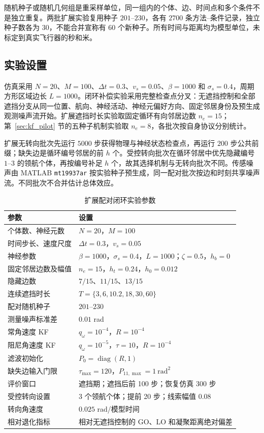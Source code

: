 \documentclass[UTF8,fontset=windows,11pt]{ctexart}
\begin{document}
随机种子或随机几何组是重采样单位，同一组内的个体、边、时间点和多个条件不是独立重复。两批扩展实验复用种子 $201$--$230$，各有 $2700$ 条方法--条件记录，独立种子数各为 $30$，不能合并宣称有 $60$ 个新种子。所有时间与距离均为模型单位，未标定到真实飞行器的秒和米。

\subsection{实验设置}

仿真采用 $N=20$、$M=100$、$\Delta t=0.3$、$v_s=0.05$、$\beta=1000$ 和 $\sigma_s=0.4$，周期方形区域边长 $L=1000$。闭环补偿实验采用完整检查点分叉：无遮挡控制和全部遮挡分支从同一位置、航向、神经活动、神经元偏好方向、固定邻居身份及预生成观测噪声流开始。扩展遮挡时长实验取固定循环有向邻居边数 $n_e=15$；第~\ref{sec:kf_pilot} 节的五种子机制实验取 $n_e=8$，各批次按自身协议分别统计。

扩展无转向批次先运行 $5000$ 步获得物理与神经状态检查点，再运行 $200$ 步公共前缀；缺失边是循环编号邻居的前 $h$ 个。受控转向批次在循环邻居中优先隐藏编号 $1$--$3$ 的领航个体，再按编号补足 $h$ 个，故其选择机制与无转向批次不同。传感噪声由 MATLAB \texttt{mt19937ar} 按实验种子预生成，同一配对批次按边和时刻共享噪声流。不同批次不合并估计总体效应。

\begin{table}[!tbp]
 \centering
 \small
 \caption{扩展配对闭环实验参数}
 \label{tab:simulation_setup}
 \begin{tabular}{ll}
 \toprule
 参数 & 设置\\
 \midrule
 个体数、神经元数 & $N=20$，$M=100$\\
 时间步长、速度尺度 & $\Delta t=0.3$，$v_s=0.05$\\
 神经参数 & $\beta=1000$，$\sigma_s=0.4$，$L=1000$；$\zeta=0.5$，$h_b=0$\\
 固定邻居边数及幅值 & $n_e=15$，$h_t=0.24$，$h_0=0.012$\\
 隐藏边数 & $7/15$、$11/15$、$13/15$\\
 连续遮挡时长 & $T=\{3,6,10.2,18,30,60\}$\\
 配对随机种子 & $201$--$230$\\
 测量噪声标准差 & $0.01$ rad\\
 常角速度 KF & $q_\omega=10^{-4}$，$R=10^{-4}$\\
 阻尼角速度 KF & $q_\omega=10^{-5}$，$\tau=10$，$R=10^{-4}$\\
 滤波初始化 & $P_0=\operatorname{diag}(R,1)$\\
缺失边输入门限 & $\tau_{\max}=120$，$P_{11,\max}=1\ \mathrm{rad}^2$\\
评价窗口 & 遮挡期；遮挡后前 100 步；恢复仿真 300 步\\
受控转向设置 & 3 个领航个体；提前 20 步；线索幅值 $0.08$\\
转向角速度 & $0.025$ rad/模型时间\\
相对退化指标 & 相对无遮挡控制的 GO、LO 和凝聚距离绝对偏差\\
 \bottomrule
 \end{tabular}
\end{table}
\end{document}
